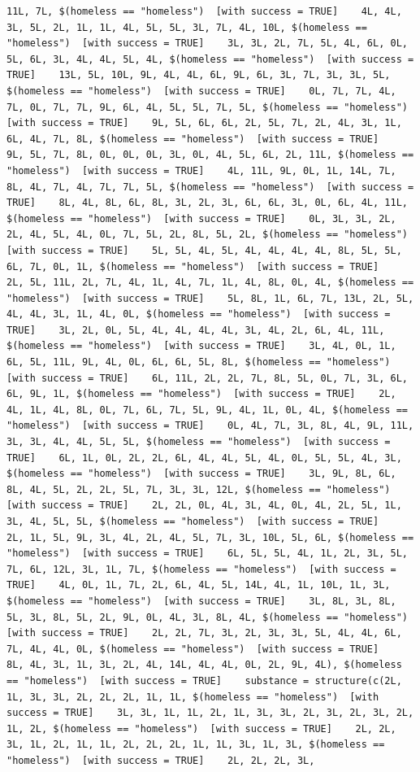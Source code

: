 \documentclass{tufte-book}\usepackage[]{graphicx}\usepackage[]{xcolor}
\makeatletter
\newenvironment{kframe}{%
 \def\at@end@of@kframe{}%
 \ifinner\ifhmode%
  \def\at@end@of@kframe{\end{minipage}}%
  \begin{minipage}{\columnwidth}%
 \fi\fi%
 \def\FrameCommand##1{\hskip\@totalleftmargin \hskip-\fboxsep
 \colorbox{shadecolor}{##1}\hskip-\fboxsep
     \hskip-\linewidth \hskip-\@totalleftmargin \hskip\columnwidth}%
 \MakeFramed {\advance\hsize-\width
   \@totalleftmargin\z@ \linewidth\hsize
   \@setminipage}}%
 {\par\unskip\endMakeFramed%
 \at@end@of@kframe}
\newenvironment{knitrout}{}{} %
\makeatother
\begin{document}
\begin{knitrout}
\begin{kframe}
\begin{verbatim}
11L, 7L, $(homeless == "homeless")  [with success = TRUE]    4L, 4L, 3L, 5L, 2L, 1L, 1L, 4L, 5L, 5L, 3L, 7L, 4L, 10L, $(homeless == "homeless")  [with success = TRUE]    3L, 3L, 2L, 7L, 5L, 4L, 6L, 0L, 5L, 6L, 3L, 4L, 4L, 5L, 4L, $(homeless == "homeless")  [with success = TRUE]    13L, 5L, 10L, 9L, 4L, 4L, 6L, 9L, 6L, 3L, 7L, 3L, 3L, 5L, $(homeless == "homeless")  [with success = TRUE]    0L, 7L, 7L, 4L, 7L, 0L, 7L, 7L, 9L, 6L, 4L, 5L, 5L, 7L, 5L, $(homeless == "homeless")  [with success = TRUE]    9L, 5L, 6L, 6L, 2L, 5L, 7L, 2L, 4L, 3L, 1L, 6L, 4L, 7L, 8L, $(homeless == "homeless")  [with success = TRUE]    9L, 5L, 7L, 8L, 0L, 0L, 0L, 3L, 0L, 4L, 5L, 6L, 2L, 11L, $(homeless == "homeless")  [with success = TRUE]    4L, 11L, 9L, 0L, 1L, 14L, 7L, 8L, 4L, 7L, 4L, 7L, 7L, 5L, $(homeless == "homeless")  [with success = TRUE]    8L, 4L, 8L, 6L, 8L, 3L, 2L, 3L, 6L, 6L, 3L, 0L, 6L, 4L, 11L, $(homeless == "homeless")  [with success = TRUE]    0L, 3L, 3L, 2L, 2L, 4L, 5L, 4L, 0L, 7L, 5L, 2L, 8L, 5L, 2L, $(homeless == "homeless")  [with success = TRUE]    5L, 5L, 4L, 5L, 4L, 4L, 4L, 4L, 8L, 5L, 5L, 6L, 7L, 0L, 1L, $(homeless == "homeless")  [with success = TRUE]    2L, 5L, 11L, 2L, 7L, 4L, 1L, 4L, 7L, 1L, 4L, 8L, 0L, 4L, $(homeless == "homeless")  [with success = TRUE]    5L, 8L, 1L, 6L, 7L, 13L, 2L, 5L, 4L, 4L, 3L, 1L, 4L, 0L, $(homeless == "homeless")  [with success = TRUE]    3L, 2L, 0L, 5L, 4L, 4L, 4L, 4L, 3L, 4L, 2L, 6L, 4L, 11L, $(homeless == "homeless")  [with success = TRUE]    3L, 4L, 0L, 1L, 6L, 5L, 11L, 9L, 4L, 0L, 6L, 6L, 5L, 8L, $(homeless == "homeless")  [with success = TRUE]    6L, 11L, 2L, 2L, 7L, 8L, 5L, 0L, 7L, 3L, 6L, 6L, 9L, 1L, $(homeless == "homeless")  [with success = TRUE]    2L, 4L, 1L, 4L, 8L, 0L, 7L, 6L, 7L, 5L, 9L, 4L, 1L, 0L, 4L, $(homeless == "homeless")  [with success = TRUE]    0L, 4L, 7L, 3L, 8L, 4L, 9L, 11L, 3L, 3L, 4L, 4L, 5L, 5L, $(homeless == "homeless")  [with success = TRUE]    6L, 1L, 0L, 2L, 2L, 6L, 4L, 4L, 5L, 4L, 0L, 5L, 5L, 4L, 3L, $(homeless == "homeless")  [with success = TRUE]    3L, 9L, 8L, 6L, 8L, 4L, 5L, 2L, 2L, 5L, 7L, 3L, 3L, 12L, $(homeless == "homeless")  [with success = TRUE]    2L, 2L, 0L, 4L, 3L, 4L, 0L, 4L, 2L, 5L, 1L, 3L, 4L, 5L, 5L, $(homeless == "homeless")  [with success = TRUE]    2L, 1L, 5L, 9L, 3L, 4L, 2L, 4L, 5L, 7L, 3L, 10L, 5L, 6L, $(homeless == "homeless")  [with success = TRUE]    6L, 5L, 5L, 4L, 1L, 2L, 3L, 5L, 7L, 6L, 12L, 3L, 1L, 7L, $(homeless == "homeless")  [with success = TRUE]    4L, 0L, 1L, 7L, 2L, 6L, 4L, 5L, 14L, 4L, 1L, 10L, 1L, 3L, $(homeless == "homeless")  [with success = TRUE]    3L, 8L, 3L, 8L, 5L, 3L, 8L, 5L, 2L, 9L, 0L, 4L, 3L, 8L, 4L, $(homeless == "homeless")  [with success = TRUE]    2L, 2L, 7L, 3L, 2L, 3L, 3L, 5L, 4L, 4L, 6L, 7L, 4L, 4L, 0L, $(homeless == "homeless")  [with success = TRUE]    8L, 4L, 3L, 1L, 3L, 2L, 4L, 14L, 4L, 4L, 0L, 2L, 9L, 4L), $(homeless == "homeless")  [with success = TRUE]    substance = structure(c(2L, 1L, 3L, 3L, 2L, 2L, 2L, 1L, 1L, $(homeless == "homeless")  [with success = TRUE]    3L, 3L, 1L, 1L, 2L, 1L, 3L, 3L, 2L, 3L, 2L, 3L, 2L, 1L, 2L, $(homeless == "homeless")  [with success = TRUE]    2L, 2L, 3L, 1L, 2L, 1L, 1L, 2L, 2L, 2L, 1L, 1L, 3L, 1L, 3L, $(homeless == "homeless")  [with success = TRUE]    2L, 2L, 2L, 3L, 
\end{verbatim}
\end{kframe}
\end{knitrout}
\end{document}
